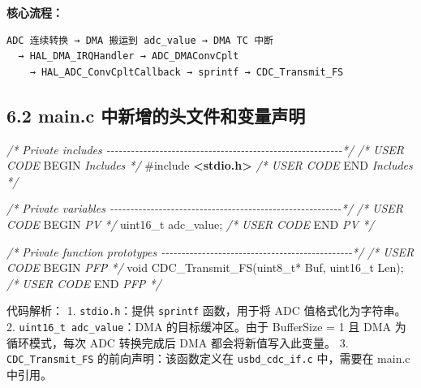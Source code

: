 \documentclass[
  chinese,
  UTF8,
  oneside,
  openany]{ctexbook}
\newenvironment{Shaded}{}{}
\newcommand{\CommentTok}[1]{\textcolor[rgb]{0.38,0.63,0.69}{\textit{#1}}}
\newcommand{\DataTypeTok}[1]{\textcolor[rgb]{0.56,0.13,0.00}{#1}}
\newcommand{\ImportTok}[1]{\textcolor[rgb]{0.00,0.50,0.00}{\textbf{#1}}}
\newcommand{\NormalTok}[1]{#1}
\newcommand{\OperatorTok}[1]{\textcolor[rgb]{0.40,0.40,0.40}{#1}}
\newcommand{\PreprocessorTok}[1]{\textcolor[rgb]{0.74,0.48,0.00}{#1}}
\newcommand{\RegionMarkerTok}[1]{#1}
\begin{document}
\textbf{核心流程：}

\begin{verbatim}
ADC 连续转换 → DMA 搬运到 adc_value → DMA TC 中断
  → HAL_DMA_IRQHandler → ADC_DMAConvCplt
    → HAL_ADC_ConvCpltCallback → sprintf → CDC_Transmit_FS
\end{verbatim}

\subsection{6.2 main.c
中新增的头文件和变量声明}\label{main.c-ux4e2dux65b0ux589eux7684ux5934ux6587ux4ef6ux548cux53d8ux91cfux58f0ux660e}

\begin{Shaded}
\begin{Highlighting}[]
\CommentTok{/* Private includes {-}{-}{-}{-}{-}{-}{-}{-}{-}{-}{-}{-}{-}{-}{-}{-}{-}{-}{-}{-}{-}{-}{-}{-}{-}{-}{-}{-}{-}{-}{-}{-}{-}{-}{-}{-}{-}{-}{-}{-}{-}{-}{-}{-}{-}{-}{-}{-}{-}{-}{-}{-}{-}{-}{-}{-}{-}{-}*/}
\CommentTok{/* USER CODE }\RegionMarkerTok{BEGIN}\CommentTok{ Includes */}
\PreprocessorTok{\#include }\ImportTok{\textless{}stdio.h\textgreater{}}
\CommentTok{/* USER CODE }\RegionMarkerTok{END}\CommentTok{ Includes */}

\CommentTok{/* Private variables {-}{-}{-}{-}{-}{-}{-}{-}{-}{-}{-}{-}{-}{-}{-}{-}{-}{-}{-}{-}{-}{-}{-}{-}{-}{-}{-}{-}{-}{-}{-}{-}{-}{-}{-}{-}{-}{-}{-}{-}{-}{-}{-}{-}{-}{-}{-}{-}{-}{-}{-}{-}{-}{-}{-}{-}{-}*/}
\CommentTok{/* USER CODE }\RegionMarkerTok{BEGIN}\CommentTok{ PV */}
\DataTypeTok{uint16\_t}\NormalTok{ adc\_value}\OperatorTok{;}
\CommentTok{/* USER CODE }\RegionMarkerTok{END}\CommentTok{ PV */}

\CommentTok{/* Private function prototypes {-}{-}{-}{-}{-}{-}{-}{-}{-}{-}{-}{-}{-}{-}{-}{-}{-}{-}{-}{-}{-}{-}{-}{-}{-}{-}{-}{-}{-}{-}{-}{-}{-}{-}{-}{-}{-}{-}{-}{-}{-}{-}{-}{-}{-}{-}{-}*/}
\CommentTok{/* USER CODE }\RegionMarkerTok{BEGIN}\CommentTok{ PFP */}
\DataTypeTok{void}\NormalTok{ CDC\_Transmit\_FS}\OperatorTok{(}\DataTypeTok{uint8\_t}\OperatorTok{*}\NormalTok{ Buf}\OperatorTok{,} \DataTypeTok{uint16\_t}\NormalTok{ Len}\OperatorTok{);}
\CommentTok{/* USER CODE }\RegionMarkerTok{END}\CommentTok{ PFP */}
\end{Highlighting}
\end{Shaded}

代码解析： 1. \texttt{stdio.h}：提供 \texttt{sprintf} 函数，用于将 ADC
值格式化为字符串。 2. \texttt{uint16\_t\ adc\_value}：DMA
的目标缓冲区。由于 BufferSize = 1 且 DMA 为循环模式，每次 ADC 转换完成后
DMA 都会将新值写入此变量。 3. \texttt{CDC\_Transmit\_FS}
的前向声明：该函数定义在 \texttt{usbd\_cdc\_if.c} 中，需要在 main.c
中引用。
\end{document}
